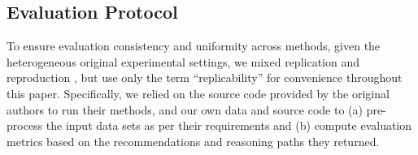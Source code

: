 \documentclass[runningheads]{llncs}
\begin{document}
\begin{table}[!t]
\caption{Interaction and knowledge information for the two considered data sets.}
\label{tab:data-stats}
\vspace{-3mm}
\centering
\setlength{\tabcolsep}{3pt}
\parbox{.4\textwidth}{
\centering
\footnotesize
{}
}
\hfill
\parbox{.45\textwidth}{
\centering
\footnotesize
\renewcommand{\thesubfigure}{ii-z}
}
\vspace{-4mm}
\end{table}

\subsection{Evaluation Protocol}
To ensure evaluation consistency and uniformity across methods, given the heterogeneous original experimental settings, we mixed replication and reproduction
\cite{10.1007/978-3-030-99736-6_37}, but use only the term ``replicability'' for convenience throughout this paper.
Specifically, we relied on the source code provided by the original authors to run their methods, and our own data and source code to (a)
pre-process the input data sets as per their requirements and (b) compute evaluation metrics based on the recommendations and reasoning paths they returned.
\end{document}
